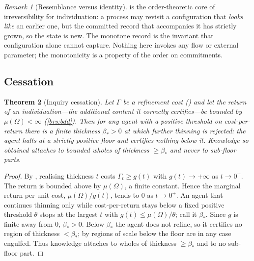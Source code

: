 \documentclass[11pt,a4paper]{article}
\theoremstyle{thmstyle}
\newtheorem{theorem}{Theorem}[section]
\theoremstyle{definition}
\theoremstyle{remark}
\newtheorem{remark}[theorem]{Remark}
\newcommand{\Space}{\Omega}
\newcommand{\thick}{\beta}
\begin{document}
\begin{remark}[Resemblance versus identity]
\label{rem:resemblance}
 is the order-theoretic core of irreversibility for
individuation: a process may revisit a configuration that \emph{looks like} an
earlier one, but the committed record that accompanies it has strictly grown, so
the state is new. The monotone record is the invariant that configuration alone
cannot capture. Nothing here invokes any flow or external parameter; the
monotonicity is a property of the order on commitments.
\end{remark}

\subsection{Cessation}

\begin{theorem}[Inquiry cessation]
\label{thm:cessation}
Let $\Gamma$ be a refinement cost \textup{(}\textup{)} and let the
return of an individuation---the additional content it correctly certifies---be
bounded by $\mu(\Space)<\infty$ \textup{(}\ref{brs:bdd}\textup{)}. Then for any
agent with a positive threshold on cost-per-return there is a finite thickness
$\thick_\ast>0$ at which further thinning is rejected: the agent halts at a
strictly positive floor and certifies nothing below it. Knowledge so obtained
attaches to bounded wholes of thickness $\ge\thick_\ast$ and never to sub-floor
parts.
\end{theorem}

\begin{proof}
By , realising thickness $t$ costs $\Gamma_t\ge g(t)$ with
$g(t)\to+\infty$ as $t\to0^+$. The return is bounded above by $\mu(\Space)$, a
finite constant. Hence the marginal return per unit cost,
$\mu(\Space)/g(t)$, tends to $0$ as $t\to0^+$. An agent that continues thinning
only while cost-per-return stays below a fixed positive threshold $\theta$ stops
at the largest $t$ with $g(t)\le\mu(\Space)/\theta$; call it $\thick_\ast$. Since
$g$ is finite away from $0$, $\thick_\ast>0$. Below $\thick_\ast$ the agent does
not refine, so it certifies no region of thickness $<\thick_\ast$; by
 regions of scale below the floor are in any case
engulfed. Thus knowledge attaches to wholes of thickness $\ge\thick_\ast$ and to
no sub-floor part.
\end{proof}
\end{document}
